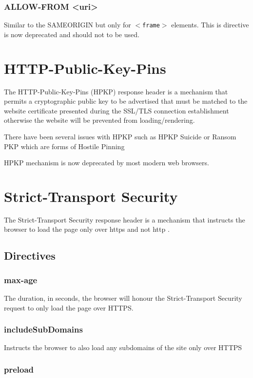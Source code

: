 \documentclass{mscreport}
\begin{document}
\subsubsection{ALLOW-FROM <uri>}
Similar to the SAMEORIGIN but only for \texttt{$<$frame$>$} elements. This is directive is now deprecated and should not to be used.

\section{HTTP-Public-Key-Pins}
The HTTP-Public-Key-Pins (HPKP) response header is a mechanism that permits a cryptographic public key to be advertised that must be matched to the website certificate presented during the SSL/TLS connection establishment otherwise the website will be prevented from loading/rendering.

There have been several issues with HPKP such as HPKP Suicide \cite{Chen2018-ft,Chuat2021-nf} or Ransom PKP \cite{Chuat2021-nf} which are forms of Hostile Pinning \cite{Evans2018-mi}

\vspace{0.3cm}
\noindent
HPKP mechanism is now deprecated by most modern web browsers.

\newpage

\section{Strict-Transport Security}
The Strict-Transport Security response header is a mechanism that instructs the browser to load the page only over https and not http \cite{Hodges2012-pe}.
\subsection{Directives}
\subsubsection{max-age}
The duration, in seconds, the browser will honour the Strict-Transport Security request to only load the page over HTTPS.

\subsubsection{includeSubDomains}
Instructs the browser to also load any subdomains of the site only over HTTPS

\subsubsection{preload}
\end{document}
